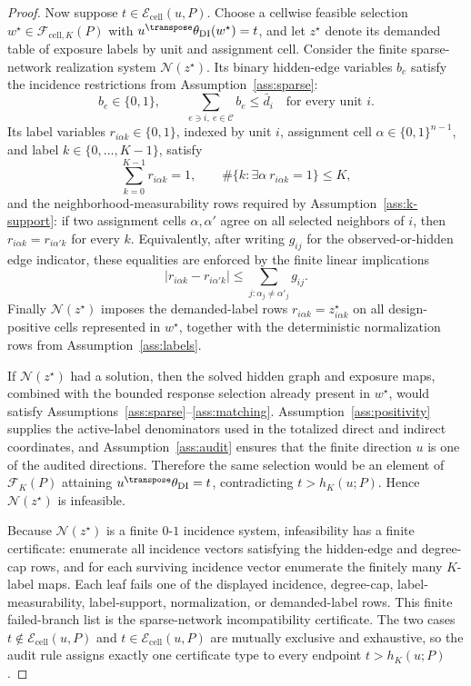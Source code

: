 \begin{proof}
Now suppose \(t\in\mathcal E_{\mathrm{cell}}(u,P)\).  Choose a cellwise feasible selection \(w^\star\in\mathcal F_{\mathrm{cell},K}(P)\) with \(u^\transpose\theta_{\mathrm{DI}}(w^\star)=t\), and let \(z^\star\) denote its demanded table of exposure labels by unit and assignment cell.  Consider the finite sparse-network realization system \(\mathcal N(z^\star)\).  Its binary hidden-edge variables \(b_e\) satisfy the incidence restrictions from Assumption~\ref{ass:sparse}:
\[
b_e\in\{0,1\},\qquad
\sum_{e\ni i,\ e\in\mathcal C} b_e\le \bar d_i
\quad\text{for every unit }i.
\]
Its label variables \(r_{i\alpha k}\in\{0,1\}\), indexed by unit \(i\), assignment cell \(\alpha\in\{0,1\}^{n-1}\), and label \(k\in\{0,\ldots,K-1\}\), satisfy
\[
\sum_{k=0}^{K-1}r_{i\alpha k}=1,\qquad
\#\{k:\exists\alpha\ r_{i\alpha k}=1\}\le K,
\]
and the neighborhood-measurability rows required by Assumption~\ref{ass:k-support}: if two assignment cells \(\alpha,\alpha'\) agree on all selected neighbors of \(i\), then \(r_{i\alpha k}=r_{i\alpha'k}\) for every \(k\).  Equivalently, after writing \(g_{ij}\) for the observed-or-hidden edge indicator, these equalities are enforced by the finite linear implications
\[
|r_{i\alpha k}-r_{i\alpha'k}|
\le
\sum_{j:\alpha_j\ne\alpha'_j} g_{ij}.
\]
Finally \(\mathcal N(z^\star)\) imposes the demanded-label rows \(r_{i\alpha k}=z^\star_{i\alpha k}\) on all design-positive cells represented in \(w^\star\), together with the deterministic normalization rows from Assumption~\ref{ass:labels}.

If \(\mathcal N(z^\star)\) had a solution, then the solved hidden graph and exposure maps, combined with the bounded response selection already present in \(w^\star\), would satisfy Assumptions~\ref{ass:sparse}--\ref{ass:matching}.  Assumption~\ref{ass:positivity} supplies the active-label denominators used in the totalized direct and indirect coordinates, and Assumption~\ref{ass:audit} ensures that the finite direction \(u\) is one of the audited directions.  Therefore the same selection would be an element of \(\mathcal F_K(P)\) attaining \(u^\transpose\theta_{\mathrm{DI}}=t\), contradicting \(t>h_K(u;P)\).  Hence \(\mathcal N(z^\star)\) is infeasible.

Because \(\mathcal N(z^\star)\) is a finite \(0\)-\(1\) incidence system, infeasibility has a finite certificate: enumerate all incidence vectors satisfying the hidden-edge and degree-cap rows, and for each surviving incidence vector enumerate the finitely many \(K\)-label maps.  Each leaf fails one of the displayed incidence, degree-cap, label-measurability, label-support, normalization, or demanded-label rows.  This finite failed-branch list is the sparse-network incompatibility certificate.  The two cases \(t\notin\mathcal E_{\mathrm{cell}}(u,P)\) and \(t\in\mathcal E_{\mathrm{cell}}(u,P)\) are mutually exclusive and exhaustive, so the audit rule assigns exactly one certificate type to every endpoint \(t>h_K(u;P)\).


\end{proof}
